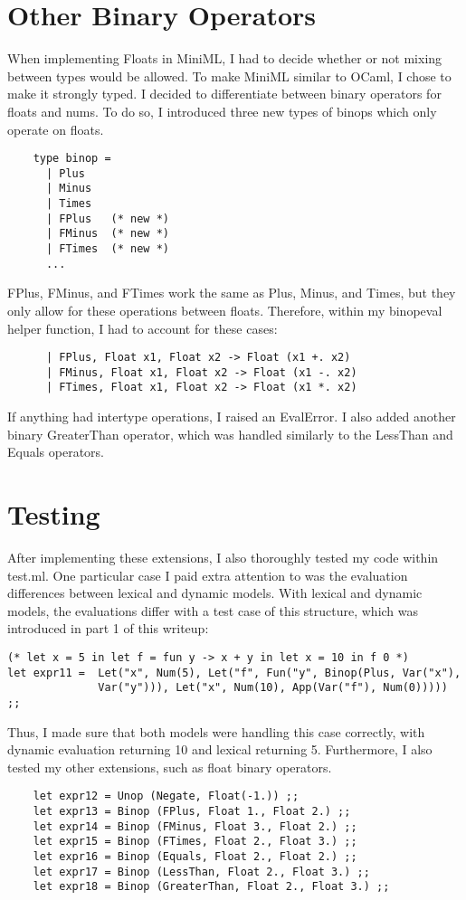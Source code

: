\documentclass{article}
\begin{document}
\section{Other Binary Operators}
When implementing Floats in MiniML, I had to decide whether or not mixing between types would be allowed. To make MiniML similar to OCaml, I chose to make it strongly typed. I decided to differentiate between binary operators for floats and nums. To do so, I introduced three new types of binops which only operate on floats. 
\begin{verbatim}
    type binop =
      | Plus
      | Minus
      | Times
      | FPlus   (* new *)
      | FMinus  (* new *)
      | FTimes  (* new *)
      ...
\end{verbatim} 
FPlus, FMinus, and FTimes work the same as Plus, Minus, and Times, but they only allow for these operations between floats. Therefore, within my binopeval helper function, I had to account for these cases:
\begin{verbatim}
      | FPlus, Float x1, Float x2 -> Float (x1 +. x2)
      | FMinus, Float x1, Float x2 -> Float (x1 -. x2)
      | FTimes, Float x1, Float x2 -> Float (x1 *. x2)
\end{verbatim} 
If anything had intertype operations, I raised an EvalError. I also added another binary GreaterThan operator, which was handled similarly to the LessThan and Equals operators. 
\newpage 
\section{Testing}
After implementing these extensions, I also thoroughly tested my code within test.ml. One particular case I paid extra attention to was the evaluation differences between lexical and dynamic models. With lexical and dynamic models, the evaluations differ with a test case of this structure, which was introduced in part 1 of this writeup:
\begin{verbatim}
(* let x = 5 in let f = fun y -> x + y in let x = 10 in f 0 *)
let expr11 =  Let("x", Num(5), Let("f", Fun("y", Binop(Plus, Var("x"), 
              Var("y"))), Let("x", Num(10), App(Var("f"), Num(0))))) ;;
\end{verbatim} 
Thus, I made sure that both models were handling this case correctly, with dynamic evaluation returning 10 and lexical returning 5. Furthermore, I also tested my other extensions, such as float binary operators. 
\begin{verbatim}
    let expr12 = Unop (Negate, Float(-1.)) ;;
    let expr13 = Binop (FPlus, Float 1., Float 2.) ;;
    let expr14 = Binop (FMinus, Float 3., Float 2.) ;;
    let expr15 = Binop (FTimes, Float 2., Float 3.) ;;
    let expr16 = Binop (Equals, Float 2., Float 2.) ;;
    let expr17 = Binop (LessThan, Float 2., Float 3.) ;;
    let expr18 = Binop (GreaterThan, Float 2., Float 3.) ;;
\end{verbatim} 
\end{document}
